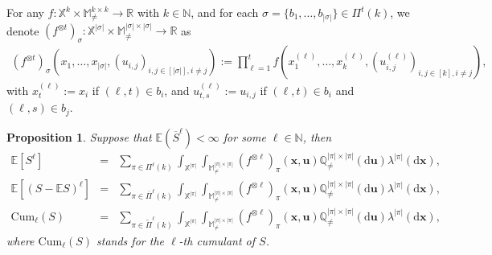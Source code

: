 \documentclass{article}
\newtheorem{prop}[theorem]{Proposition}
\theoremstyle{definition}
\numberwithin{equation}{section}
\theoremstyle{remark}
\newcommand{\E}{\mathbb{E}}
\newcommand{\N}{\mathbb{N}}
\newcommand{\cum}{\mathrm{Cum}}
\begin{document}
For any $f: \mathbb{X}^k\times \mathbb{M}^{k\times k}_{\neq}\to\mathbb{R}$ with $k\in\mathbb{N}$, and for each $\sigma=\{b_1,\dots,b_{|\sigma|}\}\in\Pi^t(k)$, we denote $(f^{\otimes t})_{\sigma}:\mathbb{X}^{|\sigma|}\times \mathbb{M}^{|\sigma|\times |\sigma|}_{\neq}\to\mathbb{R}$ as 
\begin{align}
  (f^{\otimes t})_{\sigma}(x_1,\dots,x_{|\sigma|},(u_{i,j})_{i,j\in[|\sigma|],i\ne j}):=\prod_{\ell=1}^t f(x^{(\ell)}_1,\dots,x^{(\ell)}_k,(u^{(\ell)}_{i,j})_{i,j\in[k],i\ne j}),
\end{align}
with $x^{(\ell)}_{t}:=x_i$ if $(\ell,t)\in b_i$, and $u^{(\ell)}_{t,s}:=u_{i,j}$ if $(\ell,t)\in b_i$ and $(\ell,s)\in b_j$.
\begin{prop}\label{prop:moments}
    Suppose that $\E\left(\overline{S}^{\ell}\right)<\infty$ for some $\ell\in\N$, then 
    \begin{eqnarray}
\E[S^{\ell}]&=&\sum_{\pi\in\Pi^\ell(k)}\int_{\mathbb{X}^{|\pi|}}\int_{\mathbb{M}^{|\pi|\times|\pi|}_{\ne}}(f^{\otimes\ell})_{\pi}(\bm{x},\bm{u})\mathbb{Q}^{|\pi|\times|\pi|}_{\ne}(\mathrm{d}\bm{u})\lambda^{|\pi|}(\mathrm{d}\bm{x}),\label{momeq-1}\\
\E[(S-\E S)^{\ell}]&=&\sum_{\pi\in\overline{\Pi}^\ell(k)}\int_{\mathbb{X}^{|\pi|}}\int_{\mathbb{M}^{|\pi|\times|\pi|}_{\ne}}(f^{\otimes\ell})_{\pi}(\bm{x},\bm{u})\mathbb{Q}^{|\pi|\times|\pi|}_{\ne}(\mathrm{d}\bm{u})\lambda^{|\pi|}(\mathrm{d}\bm{x}),\label{momeq-2}\\
\cum_\ell(S)&=&\sum_{\pi\in\widetilde{\Pi}^\ell(k)}\int_{\mathbb{X}^{|\pi|}}\int_{\mathbb{M}^{|\pi|\times|\pi|}_{\ne}}(f^{\otimes\ell})_{\pi}(\bm{x},\bm{u})\mathbb{Q}^{|\pi|\times|\pi|}_{\ne}(\mathrm{d}\bm{u})\lambda^{|\pi|}(\mathrm{d}\bm{x}),\label{momeq-3}
\end{eqnarray}
where $\cum_\ell(S)$ stands for the $\ell$-th cumulant of $S$.
\end{prop}
\end{document}
